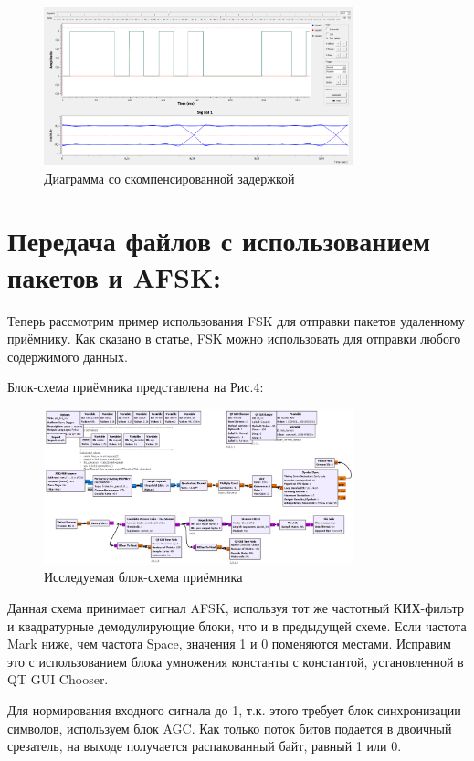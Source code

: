 \documentclass[12pt]{article}
\begin{document}
\begin{figure}[H]
    \centering
    \includegraphics[width=0.8\textwidth]{pics/a0000-img003.png}
    \caption{Диаграмма со скомпенсированной задержкой}
\end{figure}

\section{Передача файлов с использованием пакетов и AFSK:}

Теперь рассмотрим пример использования FSK для отправки пакетов удаленному приёмнику. Как сказано в статье, FSK можно использовать для отправки любого содержимого данных.

Блок-схема приёмника представлена на Рис.4:

\begin{figure}[H]
    \centering
    \includegraphics[width=0.8\textwidth]{pics/a0000-img004.png}
    \caption{Исследуемая блок-схема приёмника}
\end{figure}

Данная схема принимает сигнал AFSK, используя тот же частотный КИХ-фильтр и квадратурные демодулирующие блоки, что и в предыдущей схеме. Если частота Mark ниже, чем частота Space, значения 1 и 0 поменяются местами. Исправим это с использованием блока умножения константы с константой, установленной в QT GUI Chooser.

Для нормирования входного сигнала до 1, т.к. этого требует блок синхронизации символов, используем блок AGC. Как только поток битов подается в двоичный срезатель, на выходе получается распакованный байт, равный 1 или 0.
\end{document}
